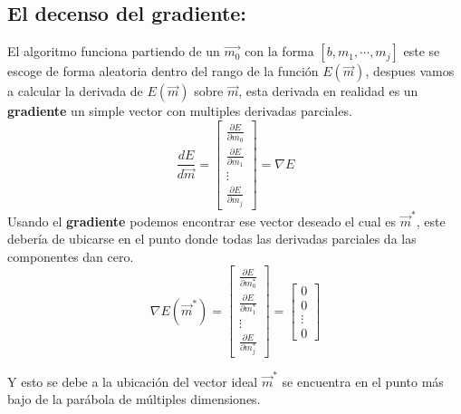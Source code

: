 \documentclass[12pt, letterpaper]{article}
\begin{document}
\subsection{El decenso del gradiente:}
El algoritmo funciona partiendo de un $\vec{m_0}$ con la forma $[b, m_1, \cdots, m_j]$
este se escoge de forma aleatoria
dentro del rango de la función $E(\vec{m})$, despues vamos a calcular la derivada 
de $E(\vec{m})$ sobre
$\vec{m}$, esta derivada en realidad es un \textbf{gradiente} un simple vector con multiples
derivadas parciales.
\[
  \frac{dE}{d\vec{m}} = \begin{bmatrix} \frac{\partial E}{\partial m_0} \\ \frac{\partial E}{\partial m_1}
                         \\ \vdots \\ \frac{\partial E}{\partial m_j} \end{bmatrix} = \nabla E
\]
Usando el \textbf{gradiente} podemos encontrar ese vector deseado el cual es $\vec{m}^*$,
este debería de ubicarse en el punto donde todas las derivadas parciales da las componentes dan cero.
\[
  \nabla E(\vec{m}^*) = \begin{bmatrix} \frac{\partial E}{\partial m^*_0}
                              \\ \frac{\partial E}{\partial m^*_1}
                              \\ \vdots
                              \\ \frac{\partial E}{\partial m^*_j} \end{bmatrix} =
                            \begin{bmatrix} 0
                              \\ 0
                              \\ \vdots
                              \\ 0 \end{bmatrix}
\]
                        
Y esto se debe a la ubicación del vector ideal $\vec{m}^*$ se encuentra en el punto más bajo de la parábola
de múltiples dimensiones.
\begin{center}
\end{center}
\end{document}

